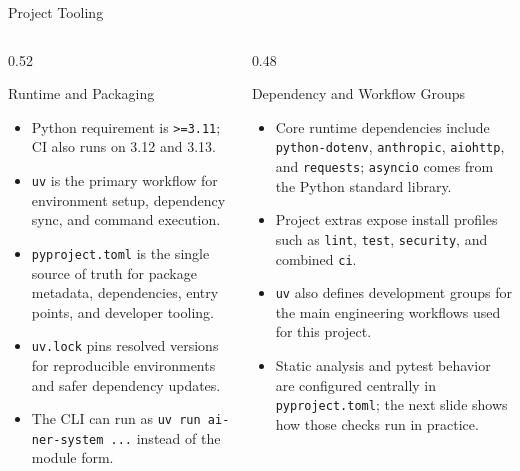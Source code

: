 \documentclass[
        11pt,
        compress,
        xcolor={dvipsnames}
    ]{beamer}
\begin{document}
\begin{frame}{Project Tooling}
  \begin{columns}[T]
    \begin{column}{0.52\textwidth}
      \begin{block}{Runtime and Packaging}
        \scriptsize
        \begin{itemize}\setlength{\itemsep}{0.3em}
          \item Python requirement is \texttt{>=3.11}; CI also runs on 3.12 and 3.13.
          \item \texttt{uv} is the primary workflow for environment setup, dependency sync, and command execution.
          \item \texttt{pyproject.toml} is the single source of truth for package metadata, dependencies, entry points, and developer tooling.
          \item \texttt{uv.lock} pins resolved versions for reproducible environments and safer dependency updates.
          \item The CLI can run as \texttt{uv run ai-ner-system ...} instead of the module form.
        \end{itemize}
      \end{block}
    \end{column}
    \begin{column}{0.48\textwidth}
      \begin{block}{Dependency and Workflow Groups}
        \scriptsize
        \begin{itemize}\setlength{\itemsep}{0.3em}
          \item Core runtime dependencies include \texttt{python-dotenv}, \texttt{anthropic}, \texttt{aiohttp}, and \texttt{requests}; \texttt{asyncio} comes from the Python standard library.
          \item Project extras expose install profiles such as \texttt{lint}, \texttt{test}, \texttt{security}, and combined \texttt{ci}.
          \item \texttt{uv} also defines development groups for the main engineering workflows used for this project.
          \item Static analysis and pytest behavior are configured centrally in \texttt{pyproject.toml}; the next slide shows how those checks run in practice.
        \end{itemize}
      \end{block}
    \end{column}
  \end{columns}
\end{frame}
\end{document}
